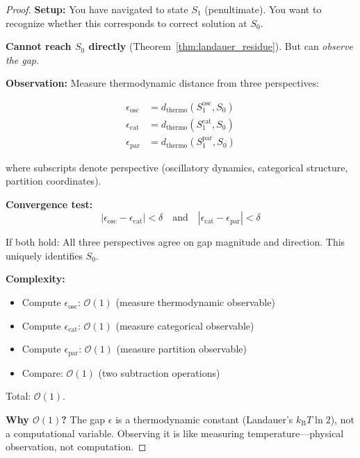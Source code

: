 \documentclass[twocolumn,10pt]{article}
\theoremstyle{definition}
\theoremstyle{remark}
\newcommand{\kB}{k_{\text{B}}}
\newcommand{\bigO}{\mathcal{O}}
\begin{document}
\begin{proof}
\textbf{Setup:} You have navigated to state $S_1$ (penultimate). You want to recognize whether this corresponds to correct solution at $S_0$.

\vspace{0.2cm}
\noindent\textbf{Cannot reach $S_0$ directly} (Theorem~\ref{thm:landauer_residue}). But can \textit{observe the gap}.

\vspace{0.2cm}
\noindent\textbf{Observation:} Measure thermodynamic distance from three perspectives:

\begin{align}
\epsilon_{\text{osc}} &= d_{\text{thermo}}(S_1^{\text{osc}}, S_0) \\
\epsilon_{\text{cat}} &= d_{\text{thermo}}(S_1^{\text{cat}}, S_0) \\
\epsilon_{\text{par}} &= d_{\text{thermo}}(S_1^{\text{par}}, S_0)
\end{align}

where subscripts denote perspective (oscillatory dynamics, categorical structure, partition coordinates).

\vspace{0.2cm}
\noindent\textbf{Convergence test:}
\begin{equation}
|\epsilon_{\text{osc}} - \epsilon_{\text{cat}}| < \delta \quad \text{and} \quad |\epsilon_{\text{cat}} - \epsilon_{\text{par}}| < \delta
\end{equation}

If both hold: All three perspectives agree on gap magnitude and direction. This uniquely identifies $S_0$.

\vspace{0.2cm}
\noindent\textbf{Complexity:}
\begin{itemize}
\item Compute $\epsilon_{\text{osc}}$: $\bigO(1)$ (measure thermodynamic observable)
\item Compute $\epsilon_{\text{cat}}$: $\bigO(1)$ (measure categorical observable)
\item Compute $\epsilon_{\text{par}}$: $\bigO(1)$ (measure partition observable)
\item Compare: $\bigO(1)$ (two subtraction operations)
\end{itemize}

Total: $\bigO(1)$.

\vspace{0.2cm}
\noindent\textbf{Why $\bigO(1)$?} The gap $\epsilon$ is a thermodynamic constant (Landauer's $\kB T \ln 2$), not a computational variable. Observing it is like measuring temperature—physical observation, not computation.
\end{proof}
\end{document}
